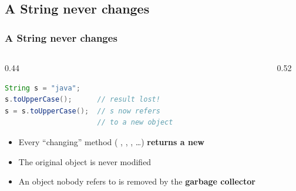 \documentclass[aspectratio=169,10pt,compress]{beamer}
\begin{document}

\subsection[Immutable]{A String never changes}




\begin{frame}[t,fragile] \frametitle{A String never changes}
  \begin{columns}[T]
    \begin{column}{0.44\textwidth}


\begin{lstlisting}[style=codesnippet, language=Java]
String s = "java";
s.toUpperCase();      // result lost!
s = s.toUpperCase();  // s now refers
                      // to a new object
\end{lstlisting}



	\begin{itemize}\small
		\item 
		Every ``changing'' method (
		, 
		, 
		, \dots)
              \textbf{returns a new} 

		\item The original object is never modified

		\item An object nobody refers to is removed by the \textbf{garbage collector}
	\end{itemize}
	
    \end{column}
    \begin{column}{0.52\textwidth}
    
      \begin{center}
\end{center}
\end{column}
\end{columns}
\end{frame}
\end{document}

